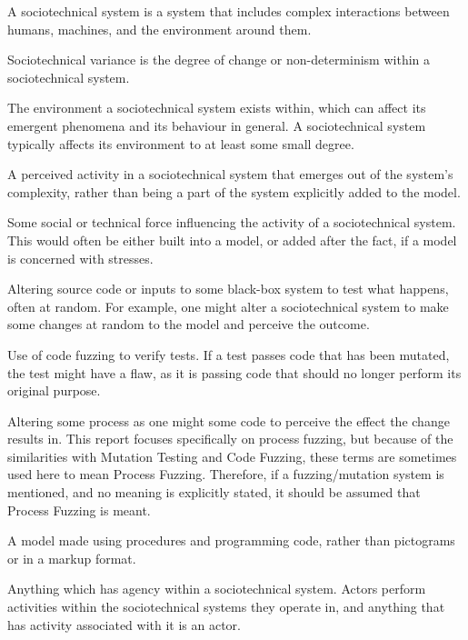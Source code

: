 \begin{description}[align=right,labelwidth=3cm]
    \item [Sociotechnical System:] A sociotechnical system is a system that includes complex interactions between humans, machines, and the environment around them.\cite{Baxter2011}
    \item [Sociotechnical Variance:] Sociotechnical variance is the degree of change or non-determinism within a sociotechnical system.
    \item [Sociotechnical Environment:] The environment a sociotechnical system exists within, which can affect its emergent phenomena and its behaviour in general. A sociotechnical system typically affects its environment to at least some small degree.
    \item [Emergent Phenomena:] A perceived activity in a sociotechnical system that emerges out of the system's complexity, rather than being a part of the system explicitly added to the model. 
    \item [Sociotechnical Stress:] Some social or technical force influencing the activity of a sociotechnical system. This would often be either built into a model, or added after the fact, if a model is concerned with stresses. 
    \item [Code Fuzzing:] Altering source code or inputs to some black-box system to test what happens, often at random\cite{Miller1988}. For example, one might alter a sociotechnical system to make some changes at random to the model and perceive the outcome.
    \item [Mutation Testing:] Use of code fuzzing to verify tests. If a test passes code that has been mutated, the test might have a flaw, as it is passing code that should no longer perform its original purpose. 
    \item [Process Fuzzing:] Altering some process as one might some code to perceive the effect the change results in. This report focuses specifically on process fuzzing, but because of the similarities with Mutation Testing and Code Fuzzing, these terms are sometimes used here to mean Process Fuzzing. Therefore, if a fuzzing/mutation system is mentioned, and no meaning is explicitly stated, it should be assumed that Process Fuzzing is meant. 
    \item [Procedural Model:] A model made using procedures and programming code, rather than pictograms or in a markup format.
    \item [Actor:] Anything which has agency within a sociotechnical system. Actors perform activities within the sociotechnical systems they operate in, and anything that has activity associated with it is an actor. 
\end{description}